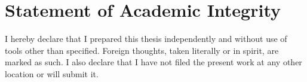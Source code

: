 \documentclass[a4paper, 10pt]{article}
\begin{document}
\section*{Statement of Academic Integrity}
\label{sec:integrity}
I hereby declare that I prepared this thesis independently and without use of tools other than specified. Foreign thoughts, taken literally or in spirit, are marked as such. I also declare that I have not filed the present work at any other location or will submit it.

\pagebreak
\newpage \thispagestyle{empty} \mbox{}
\pagebreak

\thispagestyle{empty}

\renewcommand{\contentsname}{Table of Contents}
\tableofcontents

\pagebreak
\newpage \thispagestyle{empty} \mbox{}
\pagebreak
\end{document}
